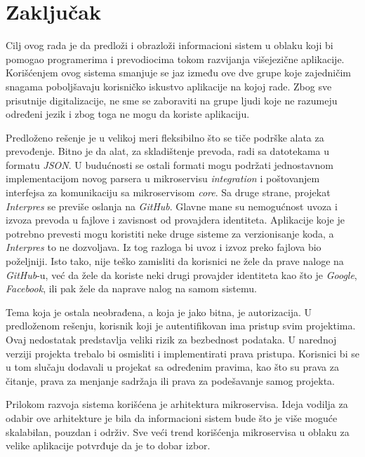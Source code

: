 \chapter{Zaključak}\label{ch:zakljucak}

Cilj ovog rada je da predloži i obrazloži informacioni sistem u oblaku koji bi pomogao 
programerima i prevodiocima tokom razvijanja višejezične aplikacije. Korišćenjem ovog 
sistema smanjuje se jaz između ove dve grupe koje zajedničim snagama poboljšavaju 
korisničko iskustvo aplikacije na kojoj rade. Zbog sve prisutnije digitalizacije, 
ne sme se zaboraviti na grupe ljudi koje ne razumeju određeni jezik i zbog toga 
ne mogu da koriste aplikaciju.

Predloženo rešenje je u velikoj meri fleksibilno što se tiče podrške alata za prevođenje.
Bitno je da alat, za skladištenje prevoda, radi sa datotekama u formatu \textit{JSON}. 
U budućnosti se ostali formati mogu podržati jednostavnom implementacijom novog parsera
u mikroservisu \textit{integration} i poštovanjem interfejsa za komunikaciju sa 
mikroservisom \textit{core}. Sa druge strane, projekat \textit{Interpres} se previše 
oslanja na \textit{GitHub}. Glavne mane su nemogućnost uvoza i izvoza prevoda u fajlove 
i zavisnost od provajdera identiteta. Aplikacije koje je potrebno prevesti mogu koristiti 
neke druge sisteme za verzionisanje koda, a \textit{Interpres} to ne dozvoljava. Iz tog 
razloga bi uvoz i izvoz preko fajlova bio poželjniji. Isto tako, 
nije teško zamisliti da korisnici ne žele da prave naloge na \textit{GitHub}-u, već da 
žele da koriste neki drugi provajder identiteta kao što je \textit{Google},
\textit{Facebook}, ili pak žele da naprave nalog na samom sistemu.

Tema koja je ostala neobrađena, a koja je jako bitna, je autorizacija. U predloženom rešenju,
korisnik koji je autentifikovan ima pristup svim projektima. Ovaj nedostatak predstavlja 
veliki rizik za bezbednost podataka. U narednoj verziji projekta trebalo bi osmisliti i 
implementirati prava pristupa. Korisnici bi se u tom slučaju dodavali u projekat sa određenim 
pravima, kao što su prava za čitanje, prava za menjanje sadržaja ili prava za podešavanje 
samog projekta.

Prilokom razvoja sistema korišćena je arhitektura mikroservisa. Ideja vodilja za odabir 
ove arhitekture je bila da informacioni sistem bude što je više moguće skalabilan, 
pouzdan i održiv. Sve veći trend korišćenja mikroservisa u oblaku za velike aplikacije 
potvrđuje da je to dobar izbor. 

